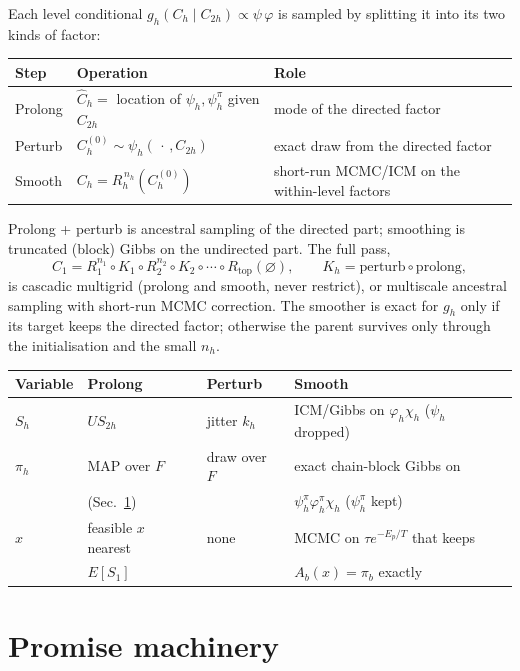 \documentclass[11pt]{article}
\newcommand{\1}{\mathds{1}}
\begin{document}
Each level conditional $g_h(C_h \mid C_{2h}) \propto \psi\,\varphi$ is sampled by splitting
it into its two kinds of factor:
\begin{center}
\begin{tabular}{@{}lll@{}}
\toprule
Step & Operation & Role \\
\midrule
Prolong & $\hat C_h = $ location of $\psi_h,\psi^\pi_h$ given $C_{2h}$ & mode of the directed factor \\
Perturb & $C_h^{(0)} \sim \psi_h(\,\cdot\,, C_{2h})$ & exact draw from the directed factor \\
Smooth  & $C_h = R_h^{\,n_h}(C_h^{(0)})$ & short-run MCMC/ICM on the within-level factors \\
\bottomrule
\end{tabular}
\end{center}
Prolong + perturb is ancestral sampling of the directed part; smoothing is truncated
(block) Gibbs on the undirected part. The full pass,
\[
  C_1 = R_1^{n_1} \circ K_1 \circ R_2^{n_2} \circ K_2 \circ \cdots \circ R_{\text{top}}(\varnothing),
  \qquad K_h = \text{perturb} \circ \text{prolong},
\]
is cascadic multigrid (prolong and smooth, never restrict), or multiscale ancestral sampling
with short-run MCMC correction. The smoother is exact for $g_h$ only if its target keeps
the directed factor; otherwise the parent survives only through the initialisation and the
small $n_h$.

\begin{center}
\begin{tabular}{@{}llll@{}}
\toprule
Variable & Prolong & Perturb & Smooth \\
\midrule
$S_h$ & $U S_{2h}$ & jitter $k_h$ & ICM/Gibbs on $\varphi_h\chi_h$ ($\psi_h$ dropped) \\
$\pi_h$ & MAP over $F$ & draw over $F$ & exact chain-block Gibbs on \\
 & (Sec.~\ref{sec:machinery}) & & $\psi^\pi_h\varphi^\pi_h\chi_h$ ($\psi^\pi_h$ kept) \\
$x$ & feasible $x$ nearest & none & MCMC on $\tau e^{-E_p/T}$ that keeps \\
 & $E[S_1]$ & & $A_b(x) = \pi_b$ exactly \\
\bottomrule
\end{tabular}
\end{center}

\section{Promise machinery}
\label{sec:machinery}
\end{document}
